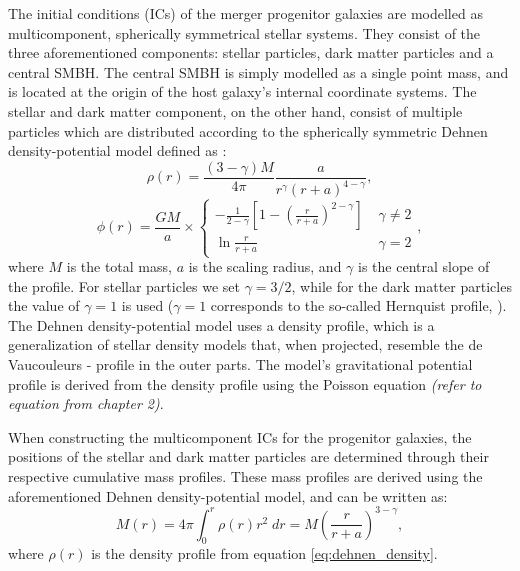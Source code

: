 \documentclass[english, oneside]{HYgradu}
\begin{document}
The initial conditions (ICs) of the merger progenitor galaxies are modelled as multicomponent, spherically symmetrical stellar systems. They consist of the three aforementioned components: stellar particles, dark matter particles and a central SMBH. The central SMBH is simply modelled as a single point mass, and is located at the origin of the host galaxy's internal coordinate systems. The stellar and dark matter component, on the other hand, consist of multiple particles which are distributed according to the spherically symmetric Dehnen density-potential model defined as \citep{Dehnen1993}:
\begin{equation}
\rho(r) = \frac{(3-\gamma)M}{4\pi} \frac{a}{r^\gamma (r+a)^{4-\gamma}}, 
\end{equation}
\begin{equation}
\phi(r) = \frac{GM}{a} \times 
\begin{cases}
	-\frac{1}{2-\gamma} \left[ 1 - \left( \frac{r}{r+a} \right)^{2-\gamma} \right] & \; \gamma \neq 2 \\
	\ln \frac{r}{r+a}	 & \; \gamma = 2
\end{cases},
\end{equation}
where $M$ is the total mass, $a$ is the scaling radius, and $\gamma$ is the central slope of the profile. For stellar particles we set $\gamma = 3/2$, while for the dark matter particles the value of $\gamma = 1$ is used ($\gamma = 1$ corresponds to the so-called Hernquist profile, \citealt{Hernquist1990}). The Dehnen density-potential model uses a density profile, which is a generalization of stellar density models that, when projected, resemble the de Vaucouleurs - profile \citep[$\log(\mu) \propto R^{1/4}$;][]{deVaucouleurs1948} in the outer parts. The model's gravitational potential profile is derived from the density profile using the Poisson equation \textit{(refer to equation from chapter 2)}. 

When constructing the multicomponent ICs for the progenitor galaxies, the positions of the stellar and dark matter particles are determined through their respective cumulative mass profiles. These mass profiles are derived using the aforementioned Dehnen density-potential model, and can be written as:
\begin{equation}
M(r) = 4\pi \int^r_0 \rho(r)r^2 \;dr = M \left( \frac{r}{r+a} \right)^{3-\gamma}, \label{eq:cumulative_mass}
\end{equation}
where $\rho(r)$ is the density profile from equation \ref{eq:dehnen_density}.
\end{document}
